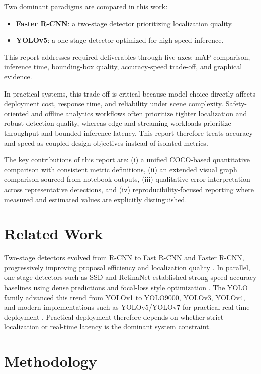 \documentclass[conference]{IEEEtran}
\begin{document}
Two dominant paradigms are compared in this work:
\begin{itemize}
	\item \textbf{Faster R-CNN}: a two-stage detector prioritizing localization quality.
	\item \textbf{YOLOv5}: a one-stage detector optimized for high-speed inference.
\end{itemize}

This report addresses required deliverables through five axes: mAP comparison, inference time, bounding-box quality, accuracy-speed trade-off, and graphical evidence.

In practical systems, this trade-off is critical because model choice directly affects deployment cost, response time, and reliability under scene complexity. Safety-oriented and offline analytics workflows often prioritize tighter localization and robust detection quality, whereas edge and streaming workloads prioritize throughput and bounded inference latency. This report therefore treats accuracy and speed as coupled design objectives instead of isolated metrics.

The key contributions of this report are: (i) a unified COCO-based quantitative comparison with consistent metric definitions, (ii) an extended visual graph comparison sourced from notebook outputs, (iii) qualitative error interpretation across representative detections, and (iv) reproducibility-focused reporting where measured and estimated values are explicitly distinguished.

\section{Related Work}
Two-stage detectors evolved from R-CNN to Fast R-CNN and Faster R-CNN, progressively improving proposal efficiency and localization quality \cite{girshick2014rcnn,girshick2015fast,ren2015faster}. In parallel, one-stage detectors such as SSD and RetinaNet established strong speed-accuracy baselines using dense predictions and focal-loss style optimization \cite{liu2016ssd,lin2017focal}. The YOLO family advanced this trend from YOLOv1 to YOLO9000, YOLOv3, YOLOv4, and modern implementations such as YOLOv5/YOLOv7 for practical real-time deployment \cite{redmon2016you,redmon2017yolo9000,redmon2018yolov3,bochkovskiy2020yolov4,yolov5,wang2022yolov7}. Practical deployment therefore depends on whether strict localization or real-time latency is the dominant system constraint.

\section{Methodology}
\end{document}
